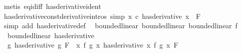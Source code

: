 \begin{isabellebody}
\ {\isacharparenleft}{\kern0pt}metis\ eq{\isacharunderscore}{\kern0pt}id{\isacharunderscore}{\kern0pt}iff\ has{\isacharunderscore}{\kern0pt}derivative{\isacharunderscore}{\kern0pt}ident{\isacharparenright}{\kern0pt}%
\endisatagproof
{\isafoldproof}%
%
\isadelimproof
\isanewline
%
\endisadelimproof
\isanewline
{}\isamarkupfalse%
\ has{\isacharunderscore}{\kern0pt}derivative{\isacharunderscore}{\kern0pt}const{\isacharbrackleft}{\kern0pt}derivative{\isacharunderscore}{\kern0pt}intros{\isacharcomma}{\kern0pt}\ simp{\isacharbrackright}{\kern0pt}{\isacharcolon}{\kern0pt}\ {\isachardoublequoteopen}{\isacharparenleft}{\kern0pt}{\isacharparenleft}{\kern0pt}{\isasymlambda}x{\isachardot}{\kern0pt}\ c{\isacharparenright}{\kern0pt}\ has{\isacharunderscore}{\kern0pt}derivative\ {\isacharparenleft}{\kern0pt}{\isasymlambda}x{\isachardot}{\kern0pt}\ {}{\isacharparenright}{\kern0pt}{\isacharparenright}{\kern0pt}\ F{\isachardoublequoteclose}\isanewline
%
\isadelimproof
\ \ %
\endisadelimproof
%
\isatagproof
{}\isamarkupfalse%
\ {\isacharparenleft}{\kern0pt}simp\ add{\isacharcolon}{\kern0pt}\ has{\isacharunderscore}{\kern0pt}derivative{\isacharunderscore}{\kern0pt}def{\isacharparenright}{\kern0pt}%
\endisatagproof
{\isafoldproof}%
%
\isadelimproof
\isanewline
%
\endisadelimproof
\isanewline
{}\isamarkupfalse%
\ {\isacharparenleft}{\kern0pt}\ bounded{\isacharunderscore}{\kern0pt}linear{\isacharparenright}{\kern0pt}\ bounded{\isacharunderscore}{\kern0pt}linear{\isacharcolon}{\kern0pt}\ {\isachardoublequoteopen}bounded{\isacharunderscore}{\kern0pt}linear\ f{\isachardoublequoteclose}%
\isadelimproof
\ %
\endisadelimproof
%
\isatagproof
\isacommand{{\isachardot}{\kern0pt}{\isachardot}{\kern0pt}}\isamarkupfalse%
%
\endisatagproof
{\isafoldproof}%
%
\isadelimproof
%
\endisadelimproof
\isanewline
\isanewline
{}\isamarkupfalse%
\ {\isacharparenleft}{\kern0pt}\ bounded{\isacharunderscore}{\kern0pt}linear{\isacharparenright}{\kern0pt}\ has{\isacharunderscore}{\kern0pt}derivative{\isacharcolon}{\kern0pt}\isanewline
\ \ {\isachardoublequoteopen}{\isacharparenleft}{\kern0pt}g\ has{\isacharunderscore}{\kern0pt}derivative\ g{\isacharprime}{\kern0pt}{\isacharparenright}{\kern0pt}\ F\ {\isasymLongrightarrow}\ {\isacharparenleft}{\kern0pt}{\isacharparenleft}{\kern0pt}{\isasymlambda}x{\isachardot}{\kern0pt}\ f\ {\isacharparenleft}{\kern0pt}g\ x{\isacharparenright}{\kern0pt}{\isacharparenright}{\kern0pt}\ has{\isacharunderscore}{\kern0pt}derivative\ {\isacharparenleft}{\kern0pt}{\isasymlambda}x{\isachardot}{\kern0pt}\ f\ {\isacharparenleft}{\kern0pt}g{\isacharprime}{\kern0pt}\ x{\isacharparenright}{\kern0pt}{\isacharparenright}{\kern0pt}{\isacharparenright}{\kern0pt}\ F{\isachardoublequoteclose}\isanewline

\end{isabellebody}
